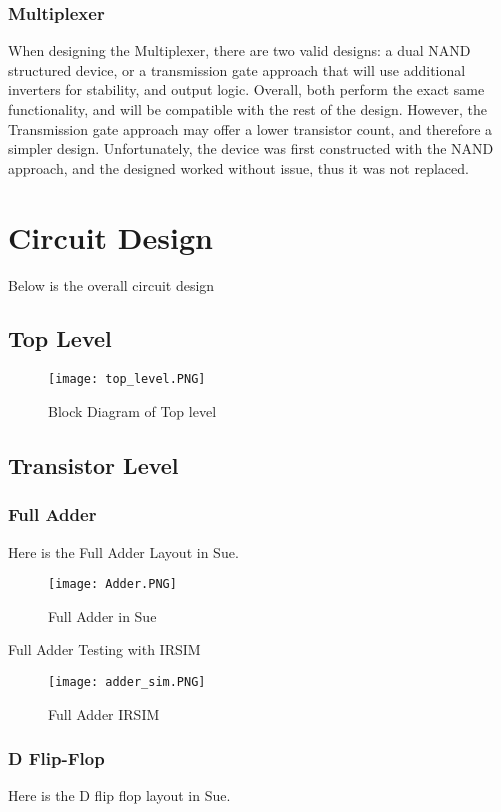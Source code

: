 \documentclass{article}
\begin{document}
\subsubsection{Multiplexer}
When designing the Multiplexer, there are two valid designs: a dual NAND structured device, or a transmission gate approach that will use additional inverters for stability, and output logic. Overall, both perform the exact same functionality, and will be compatible with the rest of the design. However, the Transmission gate approach may offer a lower transistor count, and therefore a simpler design. Unfortunately, the device was first constructed with the NAND approach, and the designed worked without issue, thus it was not replaced. 

\section{Circuit Design}
Below is the overall circuit design
\subsection{Top Level}

\begin{figure}[H]
    \centering
    \texttt{[image: top\_level.PNG]}
    \caption{Block Diagram of Top level}
    \label{fig:top_level}
\end{figure}


\subsection{Transistor Level}

\subsubsection{Full Adder}
Here is the Full Adder Layout in Sue.
\begin{figure}[H]
    \centering
    \texttt{[image: Adder.PNG]}
    \caption{Full Adder in Sue}
    \label{fig:adder_sue}
\end{figure}
Full Adder Testing with IRSIM
\begin{figure}[H]
    \centering
    \texttt{[image: adder\_sim.PNG]}
    \caption{Full Adder IRSIM}
    \label{fig:adder_sim}
\end{figure}

\subsubsection{D Flip-Flop}
Here is the D flip flop layout in Sue.
\end{document}
